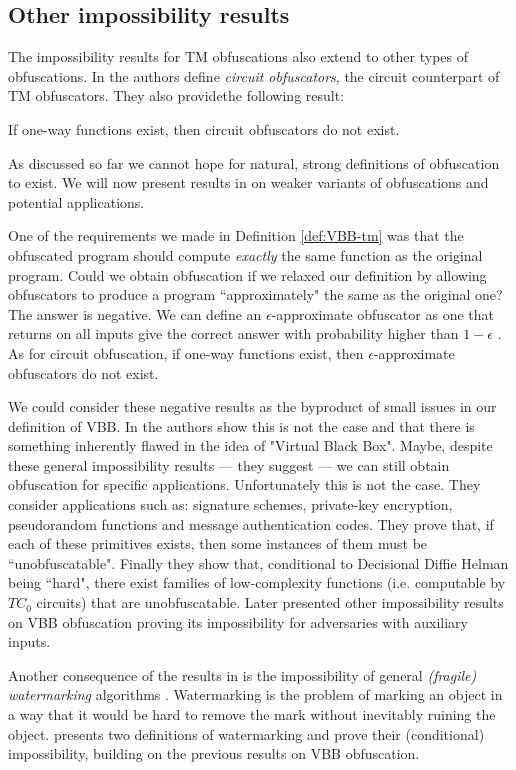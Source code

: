 \subsection{Other impossibility results}

The impossibility results for TM obfuscations also extend to other types of obfuscations.
In \cite{VBB-imp} the authors define \emph{circuit obfuscators}, the circuit counterpart of TM obfuscators. They also providethe following result:

\begin{mytheorem}
	If one-way functions exist, then circuit obfuscators do not exist.
\end{mytheorem}

As discussed so far we cannot hope for natural, strong definitions of obfuscation to exist. We will now present results in \cite{VBB-imp} on weaker variants of obfuscations and potential applications.

One of the requirements we made in Definition \ref{def:VBB-tm} was that the obfuscated program should compute \emph{exactly} the same function as the original program. Could we obtain obfuscation if we relaxed our definition by allowing obfuscators to produce a program ``approximately" the same as the original one?
The answer is negative. We can define an $\epsilon$-approximate obfuscator as one that returns on all inputs give the correct answer with probability higher than $1-\epsilon$ \cite{VBB-imp}. As for circuit obfuscation, if one-way functions exist, then $\epsilon$-approximate obfuscators do not exist.

We could consider these negative results as the byproduct of small issues in our definition of VBB. In \cite{VBB-imp} the authors show this is not the case and that there is something inherently flawed in the idea of "Virtual Black Box". Maybe, despite these general impossibility results --- they suggest --- we can still obtain obfuscation for specific applications. Unfortunately this is not the case. They consider applications such as: signature schemes, private-key encryption, pseudorandom functions and message authentication codes. They prove that, if each of these primitives exists, then some instances of them must be ``unobfuscatable".
Finally they show that, conditional to Decisional Diffie Helman being ``hard", there exist families of low-complexity functions (i.e. computable by $TC_0$ circuits) that are unobfuscatable.
Later \cite{VBB-imp-aux} presented other impossibility results on VBB obfuscation proving its impossibility for adversaries with auxiliary inputs.

Another consequence of the results in \cite{VBB-imp} is the impossibility of general \emph{(fragile) watermarking} algorithms \cite{collberg2002watermarking}. 
Watermarking is the problem of marking an object in a way that it would be hard to remove the mark without inevitably ruining the object. \cite{VBB-imp} presents two definitions of watermarking and prove their (conditional) impossibility, building on the previous results on VBB obfuscation.


